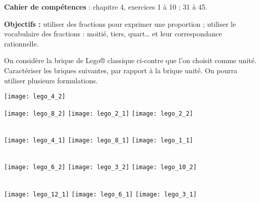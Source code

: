 \vfill

\textcolor{PartieGeometrie}{\sffamily\bfseries Cahier de compétences} : chapitre 4, exercices 1 à 10 ; 31 à 45.


\activites

\begin{activite}
   {\bf Objectifs :} utiliser des fractions pour exprimer une proportion ; utiliser le vocabulaire des fractions : moitié, tiers, quart\dots{} et leur correspondance rationnelle.
   \begin{QCM}
      \begin{minipage}{10cm}
         On considère la brique de Lego® classique ci-contre que l'on choisit comme unité. Caractériser les briques suivantes, par rapport à la brique unité. On pourra utiliser plusieurs formulations.
      \end{minipage}
      \hspace{2cm}
      \begin{minipage}{5cm}
         \texttt{[image: lego\_4\_2]}
      \end{minipage}
      \partie[]
         \texttt{[image: lego\_8\_2]}
         \hspace{2.6cm}
         \texttt{[image: lego\_2\_1]}
         \hspace{4.8cm}
         \texttt{[image: lego\_2\_2]} \\ [2.5mm]
         \pf \hfill \pf \hfill \pf \\ [2.5mm]
         \pf \hfill \pf \hfill \pf \smallskip

      \partie[]
         \texttt{[image: lego\_4\_1]}
         \hspace{1.3cm}
         \texttt{[image: lego\_8\_1]}
         \hspace{2.7cm}
         \texttt{[image: lego\_1\_1]} \\ [2.5mm]
         \pf \hfill \pf \hfill \pf \\ [2.5mm]
         \pf \hfill \pf \hfill \pf \smallskip
         
      \partie[]
         \texttt{[image: lego\_6\_2]}
         \hspace{2.8cm}
         \texttt{[image: lego\_3\_2]}
         \hspace{2.5cm}
         \texttt{[image: lego\_10\_2]} \\ [2.5mm]
         \pf \hfill \pf \hfill \pf \\ [2.5mm]
         \pf \hfill \pf \hfill \pf \smallskip
      
      \partie[]
         \texttt{[image: lego\_12\_1]}
         \hspace{0.5cm}
         \texttt{[image: lego\_6\_1]}
         \hspace{2cm}
         \texttt{[image: lego\_3\_1]} \\ [2.5mm]
         \pf \hfill \pf \hfill \pf \\ [2.5mm]
         \pf \hfill \pf \hfill \pf \medskip
   \end{QCM}
\end{activite}
   


